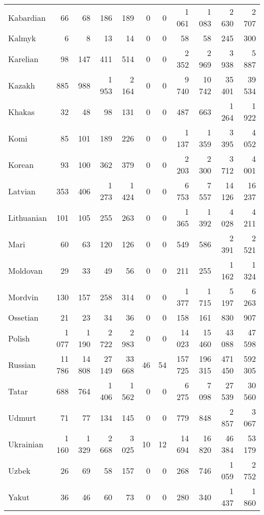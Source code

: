 \begin{table}[!h]
\begin{tabular}{lrrrrrrrrrr}
Kabardian & 66 & 68 & 186 & 189 & 0 & 0 & 1 061 & 1 083 & 2 630 & 2 707\\
Kalmyk & 6 & 8 & 13 & 14 & 0 & 0 & 58 & 58 & 245 & 300\\
Karelian & 98 & 147 & 411 & 514 & 0 & 0 & 2 352 & 2 969 & 3 938 & 5 887\\
Kazakh & 885 & 988 & 1 953 & 2 164 & 0 & 0 & 9 740 & 10 742 & 35 401 & 39 534\\
Khakas & 32 & 48 & 98 & 131 & 0 & 0 & 487 & 663 & 1 264 & 1 922\\
Komi & 85 & 101 & 189 & 226 & 0 & 0 & 1 137 & 1 359 & 3 395 & 4 052\\
Korean & 93 & 100 & 362 & 379 & 0 & 0 & 2 203 & 2 300 & 3 712 & 4 001\\
Latvian & 353 & 406 & 1 273 & 1 424 & 0 & 0 & 6 753 & 7 557 & 14 126 & 16 237\\
Lithuanian & 101 & 105 & 255 & 263 & 0 & 0 & 1 365 & 1 392 & 4 028 & 4 211\\
Mari & 60 & 63 & 120 & 126 & 0 & 0 & 549 & 586 & 2 391 & 2 521\\
Moldovan & 29 & 33 & 49 & 56 & 0 & 0 & 211 & 255 & 1 162 & 1 324\\
Mordvin & 130 & 157 & 258 & 314 & 0 & 0 & 1 377 & 1 715 & 5 197 & 6 263\\
Ossetian & 21 & 23 & 34 & 36 & 0 & 0 & 158 & 161 & 830 & 907\\
Polish & 1 077 & 1 190 & 2 722 & 2 983 & 0 & 0 & 14 023 & 15 460 & 43 088 & 47 598\\
Russian & 11 786 & 14 808 & 27 149 & 33 668 & 46 & 54 & 157 725 & 196 315 & 471 450 & 592 305\\
Tatar & 688 & 764 & 1 406 & 1 562 & 0 & 0 & 6 275 & 7 098 & 27 539 & 30 560\\
Udmurt & 71 & 77 & 134 & 145 & 0 & 0 & 779 & 848 & 2 857 & 3 067\\
Ukrainian & 1 160 & 1 329 & 2 668 & 3 025 & 10 & 12 & 14 694 & 16 820 & 46 384 & 53 179\\
Uzbek & 26 & 69 & 58 & 157 & 0 & 0 & 268 & 746 & 1 059 & 2 752\\
Yakut & 36 & 46 & 60 & 73 & 0 & 0 & 280 & 340 & 1 437 & 1 860\\
\bottomrule
\end{tabular}
\end{table}